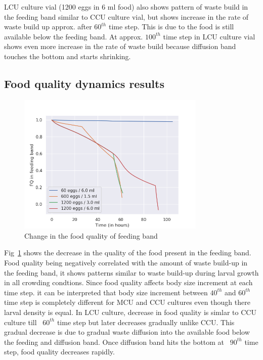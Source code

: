 \noindent LCU culture vial (1200 eggs in 6 ml food) also shows pattern of waste build in the feeding band similar to CCU culture vial, but shows increase in the rate of waste build up approx. after $60^{th}$ time step. This is due to the food is still available below the feeding band. At approx. $100^{th}$ time step in LCU culture vial shows even more increase in the rate of waste build because diffusion band touches the bottom and starts shrinking.\\
\subsection{Food quality dynamics results}
\begin{figure}[h]
  \centering
  \includegraphics[width=0.8\textwidth]{C2/Figs/fQ}
  \caption{Change in the food quality of feeding band}
  \label{fig:fQ}
\end{figure}
\noindent Fig~\ref{fig:fQ} shows the decrease in the quality of the food present in the feeding band. Food quality being negatively correlated with the amount of waste build-up in the feeding band, it shows patterns similar to waste build-up during larval growth in all crowding condtions. Since food quality affects body size increment at each time step. it can be interpreted that body size increment between $40^{th}$ and $60^{th}$ time step is completely different for MCU and CCU cultures even though there larval density is equal. In LCU culture, decrease in food quality is simlar to CCU culture till ~$60^{th}$ time step but later decreases gradually unlike CCU. This gradual decrease is due to gradual waste diffusion into the available food below the feeding and diffusion band. Once diffusion band hits the bottom at ~$90^{th}$ time step, food quality decreases rapidly.
\pagebreak

